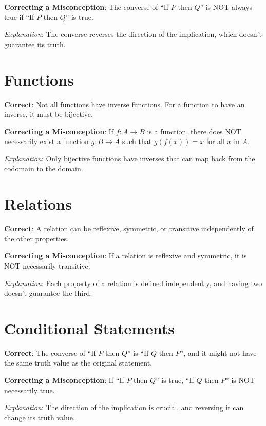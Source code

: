 \documentclass[12pt]{article}
\begin{document}
\textbf{Correcting a Misconception}: The converse of ``If \(P\) then \(Q\)'' is NOT always true if ``If \(P\) then \(Q\)'' is true.

\textit{Explanation}: The converse reverses the direction of the implication, which doesn't guarantee its truth.

\section*{Functions}
\textbf{Correct}: Not all functions have inverse functions. For a function to have an inverse, it must be bijective.

\textbf{Correcting a Misconception}: If \(f: A \rightarrow B\) is a function, there does NOT necessarily exist a function \(g: B \rightarrow A\) such that \(g(f(x)) = x\) for all \(x\) in \(A\).

\textit{Explanation}: Only bijective functions have inverses that can map back from the codomain to the domain.

\section*{Relations}
\textbf{Correct}: A relation can be reflexive, symmetric, or transitive independently of the other properties.

\textbf{Correcting a Misconception}: If a relation is reflexive and symmetric, it is NOT necessarily transitive.

\textit{Explanation}: Each property of a relation is defined independently, and having two doesn't guarantee the third.

\section*{Conditional Statements}
\textbf{Correct}: The converse of ``If \(P\) then \(Q\)'' is ``If \(Q\) then \(P\)'', and it might not have the same truth value as the original statement.

\textbf{Correcting a Misconception}: If ``If \(P\) then \(Q\)'' is true, ``If \(Q\) then \(P\)'' is NOT necessarily true.

\textit{Explanation}: The direction of the implication is crucial, and reversing it can change its truth value.
\end{document}
